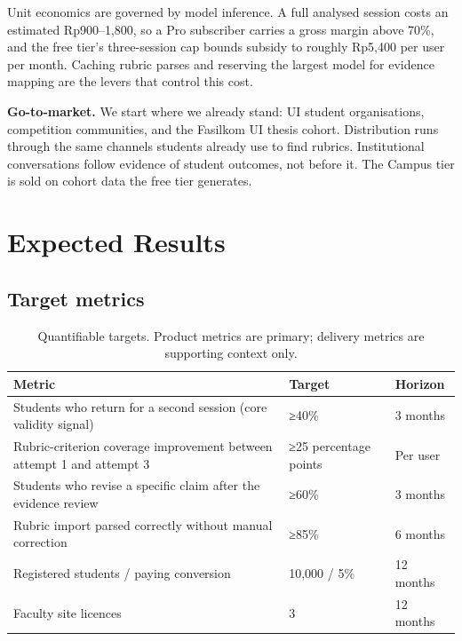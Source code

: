 Unit economics are governed by model inference. A full analysed session costs
an estimated Rp900--1,800, so a Pro subscriber carries a gross margin above
70\%, and the free tier's three-session cap bounds subsidy to roughly Rp5,400
per user per month. Caching rubric parses and reserving the largest model for
evidence mapping are the levers that control this cost.

\textbf{Go-to-market.} We start where we already stand: UI student
organisations, competition communities, and the Fasilkom UI thesis cohort.
Distribution runs through the same channels students already use to find
rubrics. Institutional conversations follow evidence of student outcomes, not
before it. The Campus tier is sold on cohort data the free tier generates.

\section{Expected Results}

\subsection{Target metrics}

\begin{table}[htbp]
\centering
\caption{Quantifiable targets. Product metrics are primary; delivery metrics
are supporting context only.}
\label{tab:metrics}
{\fontsize{10.5}{13}\selectfont
\begin{tabularx}{\textwidth}{@{}X L{3.0cm} L{2.6cm}@{}}
\toprule
\textbf{Metric} & \textbf{Target} & \textbf{Horizon} \\
\midrule
Students who return for a second session (core validity signal) &
≥40\% & 3 months \\
Rubric-criterion coverage improvement between attempt 1 and attempt 3 &
≥25 percentage points & Per user \\
Students who revise a specific claim after the evidence review &
≥60\% & 3 months \\
Rubric import parsed correctly without manual correction &
≥85\% & 6 months \\
Registered students / paying conversion & 10,000 / 5\% & 12 months \\
Faculty site licences & 3 & 12 months \\
\bottomrule
\end{tabularx}}
\end{table}

